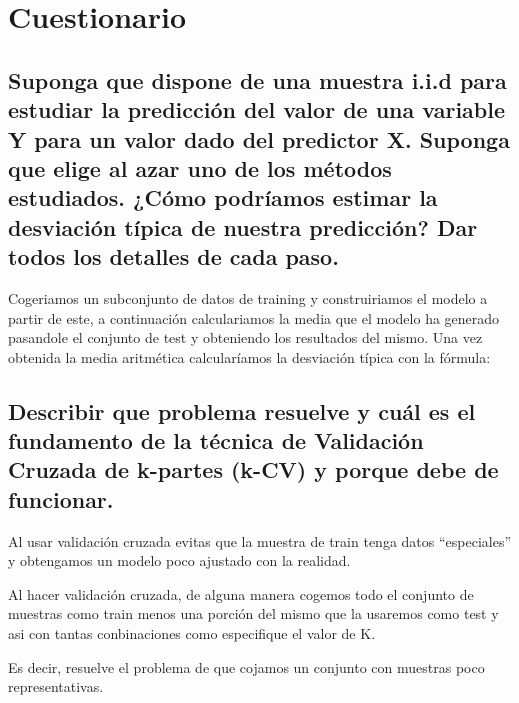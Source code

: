 \newpage %

\tableofcontents %

\listoffigures


\newpage




\section{Cuestionario}


\subsection{Suponga que dispone de una muestra i.i.d para estudiar la predicción del valor de una variable Y para un valor dado del predictor X.  Suponga que elige al azar uno de los métodos estudiados. ¿Cómo podríamos estimar la desviación típica de nuestra predicción? Dar todos los detalles de cada paso.}

Cogeriamos un subconjunto de datos de training y construiriamos el modelo a partir de este, a continuación calculariamos la media que el modelo ha generado pasandole el conjunto de test y obteniendo los resultados del mismo. Una vez obtenida la media aritmética calcularíamos la desviación típica con la fórmula:


\subsection{Describir que problema resuelve y cuál es el fundamento de la técnica de Validación Cruzada de k-partes (k-CV) y porque debe de funcionar. }

Al usar validación cruzada evitas que la muestra de train tenga datos ``especiales'' y obtengamos un modelo poco ajustado con la realidad. 

Al hacer validación cruzada, de alguna manera cogemos todo el conjunto de muestras como train menos una porción del mismo que la usaremos como test y asi con tantas conbinaciones como especifique el valor de K. 

Es decir, resuelve el problema de que cojamos un conjunto con muestras poco representativas.

